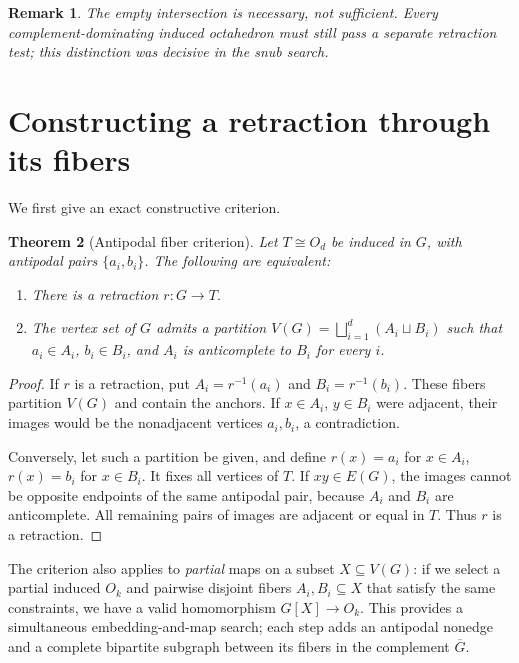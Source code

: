 \documentclass[11pt]{article}
\newtheorem{theorem}{Theorem}[section]
\newtheorem{remark}[theorem]{Remark}
\begin{document}
\begin{remark}
The empty intersection is necessary, not sufficient. Every
complement-dominating induced octahedron must still pass a separate
retraction test; this distinction was decisive in the snub search.
\end{remark}

\section{Constructing a retraction through its fibers}
We first give an exact constructive criterion.
\begin{theorem}[Antipodal fiber criterion]\label{thm:fibers}
Let \(T\cong O_d\) be induced in \(G\), with antipodal pairs
\(\{a_i,b_i\}\). The following are equivalent:
\begin{enumerate}
\item There is a retraction \(r:G\to T\).
\item The vertex set of \(G\) admits a partition
\(V(G)=\bigsqcup_{i=1}^d(A_i\sqcup B_i)\) such that
\(a_i\in A_i\), \(b_i\in B_i\), and \(A_i\) is anticomplete to \(B_i\)
for every \(i\).
\end{enumerate}
\end{theorem}
\begin{proof}
If \(r\) is a retraction, put \(A_i=r^{-1}(a_i)\) and
\(B_i=r^{-1}(b_i)\). These fibers partition \(V(G)\) and contain
the anchors. If \(x\in A_i\), \(y\in B_i\) were adjacent, their
images would be the nonadjacent vertices \(a_i,b_i\), a contradiction.

Conversely, let such a partition be given, and define \(r(x)=a_i\)
for \(x\in A_i\), \(r(x)=b_i\) for \(x\in B_i\).
It fixes all vertices of \(T\). If \(xy\in E(G)\), the images
cannot be opposite endpoints of the same antipodal pair, because
\(A_i\) and \(B_i\) are anticomplete. All remaining pairs of
images are adjacent or equal in \(T\). Thus \(r\) is a retraction.
\end{proof}

The criterion also applies to \emph{partial} maps on a subset
\(X\subseteq V(G)\): if we select a partial induced \(O_k\) and
pairwise disjoint fibers \(A_i,B_i\subseteq X\) that satisfy the
same constraints, we have a valid homomorphism \(G[X]\to O_k\).
This provides a simultaneous embedding-and-map search; each step
adds an antipodal nonedge and a complete bipartite subgraph between
its fibers in the complement \(\overline G\).
\end{document}
